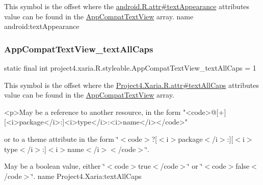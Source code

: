 This symbol is the offset where the \hyperlink{}{android.\+R.\+attr\#text\+Appearance} attribute\textquotesingle{}s value can be found in the \hyperlink{classproject4_1_1xaria_1_1R_1_1styleable_aabfaf2a95fcd2f9933956d90112a5a8a}{App\+Compat\+Text\+View} array.  name android\+:text\+Appearance \mbox{\label{classproject4_1_1xaria_1_1R_1_1styleable_a6cae197d9bb81d300174304d1eaaa5cd}} 
\subsubsection{\texorpdfstring{App\+Compat\+Text\+View\+\_\+text\+All\+Caps}{AppCompatTextView\_textAllCaps}}
{\footnotesize\ttfamily static final int project4.\+xaria.\+R.\+styleable.\+App\+Compat\+Text\+View\+\_\+text\+All\+Caps = 1\hspace{0.3cm}{\ttfamily [static]}}

This symbol is the offset where the \hyperlink{}{Project4.\+Xaria.\+R.\+attr\#text\+All\+Caps} attribute\textquotesingle{}s value can be found in the \hyperlink{classproject4_1_1xaria_1_1R_1_1styleable_aabfaf2a95fcd2f9933956d90112a5a8a}{App\+Compat\+Text\+View} array.

\begin{DoxyVerb}      <p>May be a reference to another resource, in the form "<code>@[+][<i>package</i>:]<i>type</i>:<i>name</i></code>"
\end{DoxyVerb}
 or to a theme attribute in the form \char`\"{}$<$code$>$?\mbox{[}$<$i$>$package$<$/i$>$\+:\mbox{]}\mbox{[}$<$i$>$type$<$/i$>$\+:\mbox{]}$<$i$>$name$<$/i$>$$<$/code$>$\char`\"{}. 

May be a boolean value, either \char`\"{}$<$code$>$true$<$/code$>$\char`\"{} or \char`\"{}$<$code$>$false$<$/code$>$\char`\"{}.  name Project4.\+Xaria\+:text\+All\+Caps \mbox{\label{classproject4_1_1xaria_1_1R_1_1styleable_aad8bec413e2350f9404e6ff0e831a85d}} 
